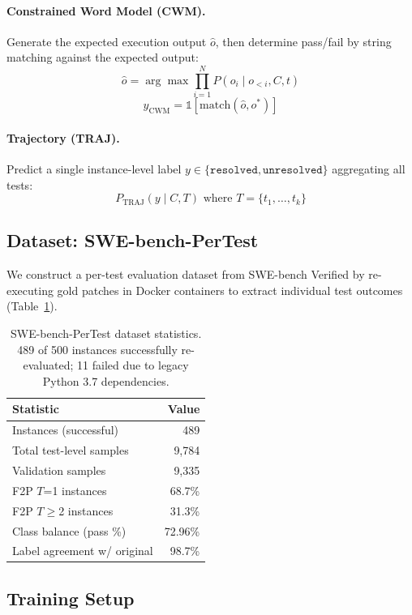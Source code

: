 \documentclass[11pt,a4paper]{article}
\begin{document}
\paragraph{Constrained Word Model (CWM).} Generate the expected execution output $\hat{o}$, then determine pass/fail by string matching against the expected output:
$$\hat{o} = \arg\max \prod_{i=1}^{N} P(o_i \mid o_{<i}, C, t)$$
$$y_\text{CWM} = \mathbb{1}[\text{match}(\hat{o}, o^*)]$$

\paragraph{Trajectory (TRAJ).} Predict a single instance-level label $y \in \{\texttt{resolved}, \texttt{unresolved}\}$ aggregating all tests:
$$P_\text{TRAJ}(y \mid C, T) \text{ where } T = \{t_1, \ldots, t_k\}$$

\subsection{Dataset: SWE-bench-PerTest}

We construct a per-test evaluation dataset from SWE-bench Verified by re-executing gold patches in Docker containers to extract individual test outcomes (Table~\ref{tab:dataset}).

\begin{table}[t]
\centering
\small
\begin{tabular}{lr}
\toprule
\textbf{Statistic} & \textbf{Value} \\
\midrule
Instances (successful) & 489 \\
Total test-level samples & 9,784 \\
Validation samples & 9,335 \\
F2P $T$=1 instances & 68.7\% \\
F2P $T\geq$2 instances & 31.3\% \\
Class balance (pass \%) & 72.96\% \\
Label agreement w/ original & 98.7\% \\
\bottomrule
\end{tabular}
\caption{SWE-bench-PerTest dataset statistics. 489 of 500 instances successfully re-evaluated; 11 failed due to legacy Python 3.7 dependencies.}
\label{tab:dataset}
\end{table}

\subsection{Training Setup}
\end{document}
